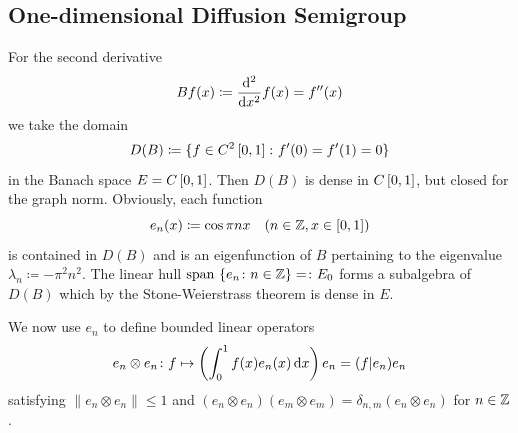 \subsection{One-dimensional Diffusion Semigroup}\label{subsec:a1-2.7}%
For the second derivative 
\[
    Bf(x) \coloneq \frac{\mathrm{d}^{2}}{\mathop{}\!\mathrm{d}{x}^{2}}f(x) = f''(x)
\]
we take the domain
\[
    D(B) \coloneq \{f \in C^{2}\left[ 0,1 \right] \colon f'(0) = f'(1) = 0\}
\]
in the Banach space $E = C\left[ 0,1 \right]$.
Then $D(B)$ is dense in $C\left[ 0,1 \right]$, but closed for the graph norm.
Obviously, each function
\[
    e_{n}(x) \coloneq \cos \pi nx \quad (n \in \mathbb{Z}, x \in \left[ 0,1 \right])
\]
is contained in $D(B)$ and is an eigenfunction of\/ $B$ pertaining to the eigenvalue $\lambda_{n} \coloneq -\pi^{2}n^{2}$.
The linear hull $\text{span }\{e_{n} \colon n \in \mathbb{Z}\} = \colon E_{0}$ forms a subalgebra of\/ $D(B)$ which by the Stone-Weierstrass theorem is dense in $E$.

We now use $e_{n}$ to define bounded linear operators 
\[
	e_{n} \otimes e_{n} \colon f \mapsto \left(\int_{0}^{1} f(x)e_{n}(x) \dx \right)e_{n} 
		= ( f | e_{n} ) e_{n} %
\]
satisfying $\|e_{n} \otimes e_{n}\| \leq 1$ and
$(e_{n} \otimes e_{n})(e_{m} \otimes e_{m}) = \delta_{n,m}(e_{n} \otimes e_{n})$ for $n \in \mathbb{Z}$.

